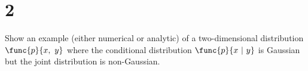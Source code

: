 \section{2}

Show an example (either numerical or analytic) of a two-dimensional distribution $\func{p}{x,\ y}$ where the conditional distribution $\func{p}{x\ \vert\ y}$ is Gaussian but the joint distribution is non-Gaussian.

